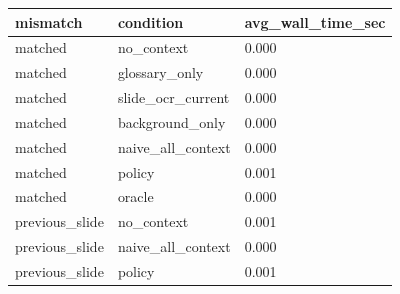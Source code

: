 \begin{tabular}{lll}
\toprule
mismatch & condition & avg\_wall\_time\_sec \\
\midrule
matched & no\_context & 0.000 \\
matched & glossary\_only & 0.000 \\
matched & slide\_ocr\_current & 0.000 \\
matched & background\_only & 0.000 \\
matched & naive\_all\_context & 0.000 \\
matched & policy & 0.001 \\
matched & oracle & 0.000 \\
previous\_slide & no\_context & 0.001 \\
previous\_slide & naive\_all\_context & 0.000 \\
previous\_slide & policy & 0.001 \\
\bottomrule
\end{tabular}
